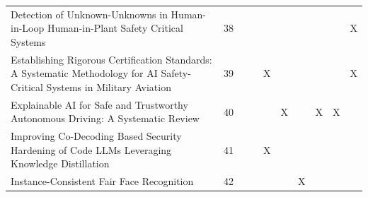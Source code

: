 \begin{landscape}
\begin{longtable}{|p{17cm}|c|c|c|c|c|c|c|c|c|}
		Detection of Unknown-Unknowns in Human-in-Loop Human-in-Plant Safety Critical Systems                                                                   & 38          &                                    &                                                           &                                                       &                                                            &                                           &                                              &                                                    & X                                  \\
		Establishing Rigorous Certification Standards: A Systematic Methodology for AI Safety-Critical Systems in Military Aviation                             & 39          &                                    &                                                           & X                                                     &                                                            &                                           &                                              &                                                    & X                                  \\
		Explainable AI for Safe and Trustworthy Autonomous Driving: A Systematic Review                                                                         & 40          &                                    &                                                           &                                                       & X                                                          &                                           & X                                            & X                                                  &                                    \\
		Improving Co-Decoding Based Security Hardening of Code LLMs Leveraging Knowledge Distillation                                                           & 41          &                                    &                                                           & X                                                     &                                                            &                                           &                                              &                                                    &                                    \\
		Instance-Consistent Fair Face Recognition                                                                                                               & 42          &                                    &                                                           &                                                       &                                                            & X                                         &                                              &                                                    &                                    \\

\end{longtable}
\end{landscape}
